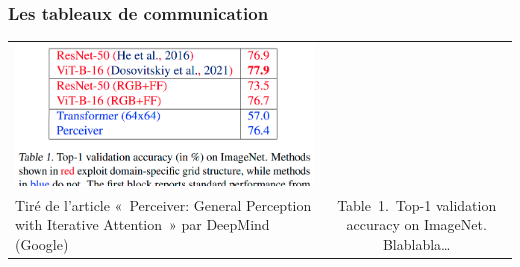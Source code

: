 \documentclass[aspectratio=169]{beamer}
\begin{document}
\begin{frame}[c]\frametitle{Les tableaux de communication}





\begin{tabular}{p{}c}
\includegraphics[width=.5\textwidth]{figures/bad-table.png}\\
\scriptsize\raggedright
Tiré de l'article «~Perceiver: General Perception with Iterative Attention~» par DeepMind (Google)
&
\begin{minipage}{.4\textwidth}
\vspace{-3.5cm}
\begin{table}\rmfamily\scriptsize
Table~1.\ Top\hspace{1pt}-\hspace{-1.08pt}1 validation accuracy on ImageNet. Blablabla\dots


\end{table}
\end{minipage}
\end{tabular}
\end{frame}
\end{document}
